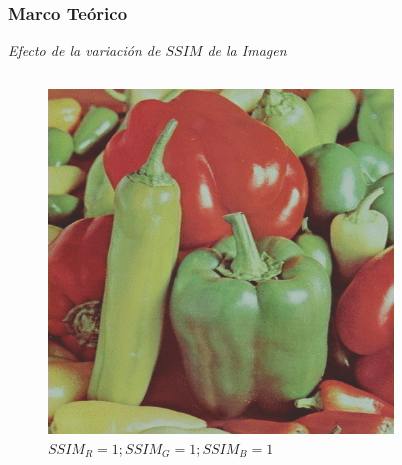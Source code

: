 \documentclass[usenames,dvipsnames]{beamer}
\begin{document}
\begin{frame} 
\frametitle{Marco Teórico} 
\begin{exampleblock}{\textit{Efecto de la variación de $SSIM$ de la Imagen}}

\end{exampleblock}
\centering
\begin{columns}[onlytextwidth]
\begin{column}{.45\textwidth}
\begin{figure}
  \includegraphics[width=\textwidth]{graphics/peppers_color_lc.jpg}
  \caption{$SSIM_R=1 ; SSIM_G=1 ; SSIM_B=1$}
\end{figure}
\end{column}
\hfill
\begin{column}{.45\textwidth}
		\begin{figure}

\end{figure}
\end{column}
\end{columns}
\end{frame}
\end{document}
